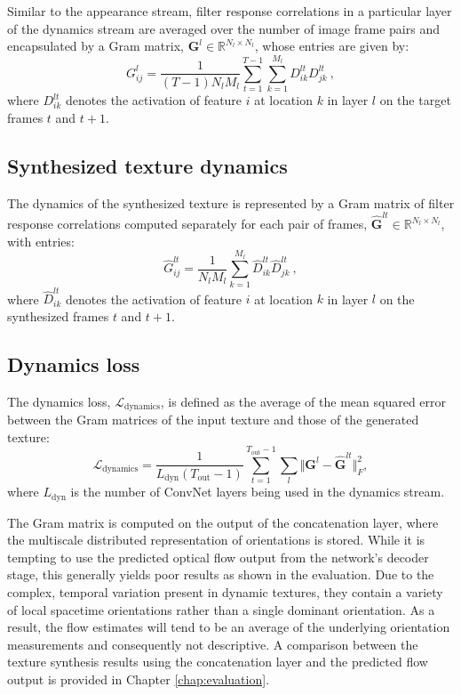 Similar to the appearance stream, filter response correlations
in a particular layer of the dynamics
stream are averaged over the number of image frame
pairs and encapsulated by a Gram matrix,
$\mathbf{G}^{l} \in \mathbb{R}^{N_l \times N_l}$,
whose entries are given by:
\begin{equation}
	G_{ij}^l = \frac{1}{(T-1) N_l M_l} \sum_{t=1}^{T-1} \sum_{k=1}^{M_l} D_{ik}^{lt} D_{jk}^{lt}\ ,	
\end{equation}
where $D_{ik}^{lt}$ denotes the activation of feature $i$ at
location $k$ in layer $l$ on the target frames $t$ and $t+1$.

\subsection{Synthesized texture dynamics}

The dynamics of the synthesized texture is represented
by a Gram matrix of filter response correlations 
computed separately for each pair of frames,
$\hat{\mathbf{G}}^{lt} \in \mathbb{R}^{N_l \times N_l}$,
with entries:
\begin{equation}
	\hat{G}_{ij}^{lt} = \frac{1}{N_l M_l} \sum_{k=1}^{M_l} \hat{D}_{ik}^{lt} \hat{D}_{jk}^{lt}\ ,	
\end{equation}
where $\hat{D}_{ik}^{lt}$ denotes the activation of feature $i$ at
location $k$ in layer $l$ on the synthesized frames $t$ and $t+1$.

\subsection{Dynamics loss}

The dynamics loss, $\mathcal{L}_\text{dynamics}$, is defined as
the average of the mean squared error between the Gram matrices
of the input texture
and those of the generated texture:
\begin{equation}
   \mathcal{L}_\text{dynamics} = \frac{1}{L_\text{dyn} (T_\text{out}-1)}\sum_{t=1}^{T_\text{out}-1} \sum_{l}  \Vert \mathbf{G}^l - \hat{\mathbf{G}}^{lt}\Vert^2_F, \label{eq:dynloss}
\end{equation}
where $L_\text{dyn}$ is the number of ConvNet layers being used
in the dynamics stream.

The Gram matrix is computed on the output of the concatenation layer,
where the multiscale distributed representation of orientations is
stored. While it is tempting to use the predicted optical flow output from the
network's decoder stage, this generally yields poor results as shown in the evaluation.
Due to the complex, temporal variation present in dynamic
textures, they contain a variety of local spacetime
orientations rather than a single dominant orientation.
As a result, the flow estimates will tend to be an average of the
underlying  orientation measurements and consequently not
descriptive. A comparison between the texture synthesis results using the concatenation layer and the predicted flow output is provided in Chapter \ref{chap:evaluation}.

